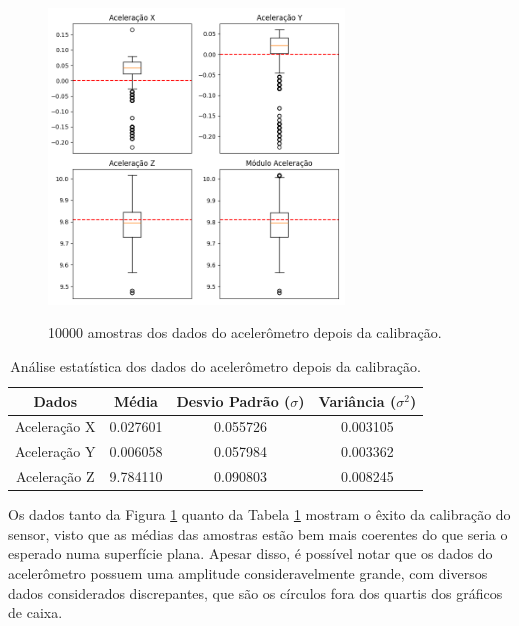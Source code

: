 \documentclass[acronym, symbols, table, deposito]{fei}
\begin{document}
	\begin{figure}[!htb]
		\centering
		\caption{10000 amostras dos dados do acelerômetro depois da calibração.}
		\includegraphics[width=0.7\textwidth]{dados_acelerometro_certos.png}
		\label{fig:dados_acelerometro_certos}
	\end{figure}
	
	\begin{table}[!htb]
		\centering
		\caption{Análise estatística dos dados do acelerômetro depois da calibração.}\label{tab:acelerometro_depois_calibracao}
		\begin{tabular}{|c|c|c|c|}
			\hline
			Dados & Média & Desvio Padrão ($\sigma$) & Variância ($\sigma^2$) \\ \hline
			\small Aceleração X & 0.027601  & 0.055726 & 0.003105 \\ \hline
			\small Aceleração Y & 0.006058  & 0.057984 & 0.003362 \\ \hline
			\small Aceleração Z & 9.784110  & 0.090803 & 0.008245 \\ \hline			
		\end{tabular}
	\end{table}
	
	Os dados tanto da Figura \ref{fig:dados_acelerometro_certos} quanto da Tabela \ref{tab:acelerometro_depois_calibracao} mostram o êxito da calibração do sensor, visto que as médias das amostras estão bem mais coerentes do que seria o esperado numa superfície plana. Apesar disso, é possível notar que os dados do acelerômetro possuem uma amplitude consideravelmente grande, com diversos dados considerados discrepantes, que são os círculos fora dos quartis dos gráficos de caixa.
	
\end{document}
